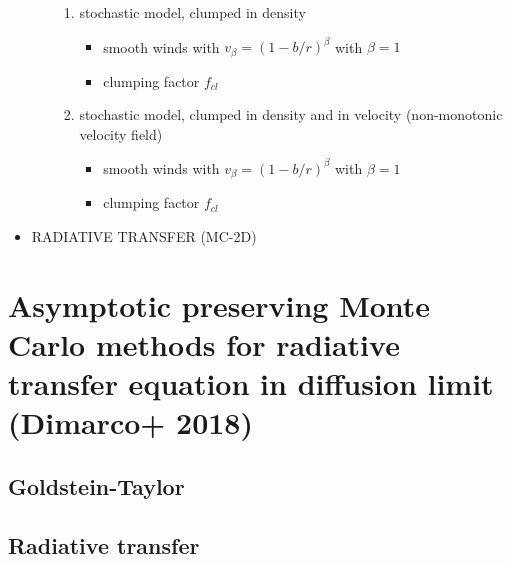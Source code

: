 \documentclass[../main/main.tex]{subfiles}
\begin{document}
\begin{itemize}
\begin{itemize}
\begin{enumerate}
\item stochastic model, clumped in density
\begin{itemize}
\item smooth winds with $v_{\beta} = (1-b/r)^{\beta}$ with $\beta = 1$
\item clumping factor $f_{cl}$
\end{itemize}

\item stochastic model, clumped in density and in velocity (non-monotonic velocity field)
\begin{itemize}
\item smooth winds with $v_{\beta} = (1-b/r)^{\beta}$ with $\beta = 1$
\item clumping factor $f_{cl}$
\end{itemize}
\end{enumerate}

\end{itemize}

\item RADIATIVE TRANSFER (MC-2D)
\end{itemize}

\newpage
\section{Asymptotic preserving Monte Carlo methods for radiative transfer equation in diffusion limit (Dimarco+ 2018)}
\subsection{Goldstein-Taylor}
\subsection{Radiative transfer}
\end{document}
